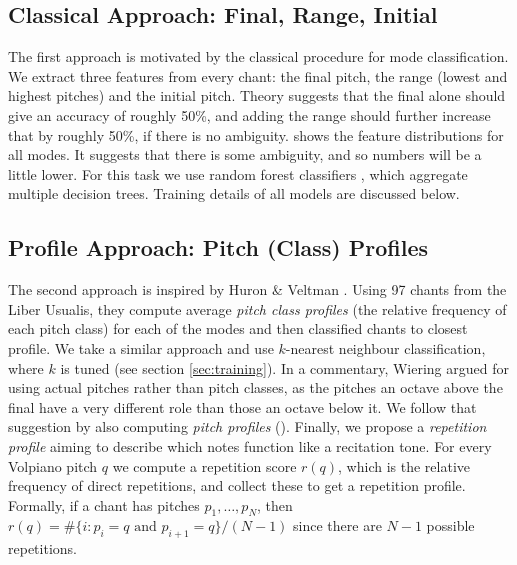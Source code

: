 \documentclass{article}
\begin{document}
\subsection{Classical Approach: Final, Range, Initial}

The first approach is motivated by the classical procedure for mode classification.
We extract three features from every chant: the final pitch, the range (lowest and highest pitches) and the initial pitch.
Theory suggests that the final alone should give an accuracy of roughly 50\%, and adding the range should further increase that by roughly 50\%, if there is no ambiguity.
 shows the feature distributions for all modes. 
It suggests that there is some ambiguity, and so numbers will be a little lower.
For this task we use random forest classifiers \cite{Breiman2001}, which aggregate multiple decision trees. 
Training details of all models are discussed below.



\subsection{Profile Approach: Pitch (Class) Profiles}

The second approach is inspired by Huron \& Veltman \cite{Huron2006a}.
Using 97 chants from the Liber Usualis, they compute average \emph{pitch class profiles} (the relative frequency of each pitch class) for each of the modes and then classified chants to closest profile.
We take a similar approach and use $k$-nearest neighbour classification, where $k$ is tuned (see section \ref{sec:training}).
In a commentary, Wiering \cite{Wiering2006} argued for using actual pitches rather than pitch classes, as the pitches an octave above the final have a very different role than those an octave below it. 
We follow that suggestion by also computing \emph{pitch profiles} ().
Finally, we propose a \emph{repetition profile} aiming to describe which notes function like a recitation tone.
For every Volpiano pitch $q$ we compute a repetition score $r(q)$, which is the relative frequency of direct repetitions, and collect these to get a repetition profile.
Formally, if a chant has pitches $p_1, \dots, p_N$, then
$r(q) = \#\{i: p_i = q \text{ and } p_{i+1} = q \} / (N-1)$  since there are $N-1$ possible repetitions.
\end{document}

